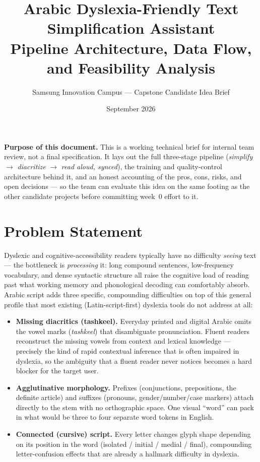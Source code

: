 \documentclass[11pt,a4paper]{article}
\title{\vspace{-1.5cm}\textbf{\Large Arabic Dyslexia-Friendly Text Simplification Assistant}\\[4pt]
\large Pipeline Architecture, Data Flow, and Feasibility Analysis}
\author{Samsung Innovation Campus --- Capstone Candidate Idea Brief}
\date{September 2026}
\begin{document}
\maketitle
\vspace{-0.8cm}

\begin{noteb}
\textbf{Purpose of this document.} This is a working technical brief for internal
team review, not a final specification. It lays out the full three-stage pipeline
(\emph{simplify} $\rightarrow$ \emph{diacritize} $\rightarrow$ \emph{read aloud, synced}),
the training and quality-control architecture behind it, and an honest accounting of
the pros, cons, risks, and open decisions --- so the team can evaluate this idea on the
same footing as the other candidate projects before committing week~0 effort to it.
\end{noteb}

\tableofcontents
\thispagestyle{empty}
\newpage

\section{Problem Statement}

Dyslexic and cognitive-accessibility readers typically have no difficulty
\emph{seeing} text --- the bottleneck is \emph{processing} it: long compound
sentences, low-frequency vocabulary, and dense syntactic structure all raise the
cognitive load of reading past what working memory and phonological decoding can
comfortably absorb. Arabic script adds three specific, compounding difficulties on
top of this general profile that most existing (Latin-script-first) dyslexia tools
do not address at all:

\begin{itemize}[leftmargin=1.4em]
  \item \textbf{Missing diacritics (tashkeel).} Everyday printed and digital Arabic
  omits the vowel marks (\emph{tashkeel}) that disambiguate pronunciation. Fluent
  readers reconstruct the missing vowels from context and lexical knowledge ---
  precisely the kind of rapid contextual inference that is often impaired in
  dyslexia, so the ambiguity that a fluent reader never notices becomes a hard
  blocker for the target user.
  \item \textbf{Agglutinative morphology.} Prefixes (conjunctions, prepositions,
  the definite article) and suffixes (pronouns, gender/number/case markers) attach
  directly to the stem with no orthographic space. One visual ``word'' can pack in
  what would be three to four separate word tokens in English.
  \item \textbf{Connected (cursive) script.} Every letter changes glyph shape
  depending on its position in the word (isolated / initial / medial / final),
  compounding letter-confusion effects that are already a hallmark difficulty in
  dyslexia.
\end{itemize}
\end{document}
